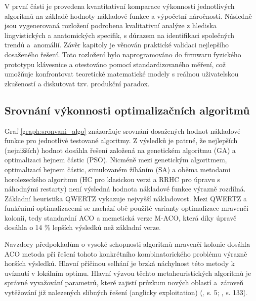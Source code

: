 \documentclass[a4paper, twoside, 12pt, czech]{article}
\begin{document}
V první části je provedena kvantitativní komparace výkonnosti jednotlivých 
algoritmů na základě hodnoty nákladové funkce a výpočetní náročnosti. Následně 
jsou vygenerovaná rozložení podrobena kvalitativní analýze z hlediska 
lingvistických a anatomických specifik, s důrazem na identifikaci společných 
trendů a~anomálií. Závěr kapitoly je věnován praktické validaci nejlepšího 
dosaženého řešení. Toto rozložení bylo naprogramováno do firmwaru fyzického 
prototypu klávesnice a otestováno pomocí standardizovaného měření, což 
umožňuje konfrontovat teoretické matematické modely s reálnou uživatelskou 
zkušeností a diskutovat tzv. produkční paradox.

\subsection{Srovnání výkonnosti optimalizačních algoritmů}
Graf \ref{graph:sronvani_algo} znázorňuje srovnání dosažených hodnot nákladové funkce pro jednotlivé 
testované algoritmy. Z výsledků je patrné, že nejlepších (nejnižších) hodnot 
dosáhla řešení založená na genetickém algoritmu (GA) a optimalizaci hejnem částic (PSO).
Nicméně mezi genetickým algoritmem, optimalizací hejnem částic, simulovaném žíháním (SA) 
a oběma metodami horolezeckého algoritmu (HC pro klasickou verzi a RRHC pro úpravu 
s náhodnými restarty) není výsledná hodnota nákladové funkce výrazně rozdílná.
Základní heuristika QWERTZ vykazuje nejvyšší nákladovost. Mezi QWERTZ a funkčními 
optimalizacemi se nachází obě použité varianty optimalizace mravenčí kolonií, tedy 
standardní ACO a memetická verze M-ACO, která díky úpravě dosáhla o 14 \% 
lepších výsledků než základní verze.

Navzdory předpokladům o vysoké schopnosti algoritmů mravenčí 
kolonie do\-sáhla ACO metoda při řešení tohoto konkrétního kombinatorického problému
vý\-razně horších výsledků. 
Hlavní příčinou selhání je brzká náchylnost této metody k uvíznutí v 
lokálním optimu. Hlavní výzvou těchto metaheuristických algoritmů je správné vyvažování 
parametrů, které zajistí průzkum nových oblastí a~zároveň vytěžování již nalezených 
slibných řešení (anglicky exploitation) (\cite{pso-overview}, s. 5; \cite{Dey2024-nk}, s. 133).
\end{document}
